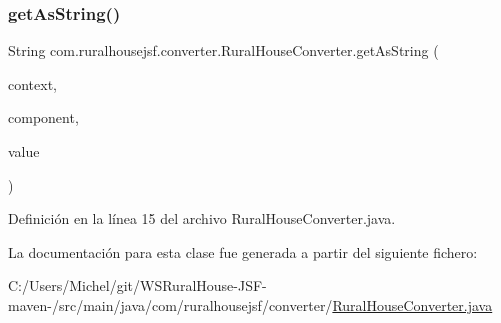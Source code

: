 \subsubsection{\texorpdfstring{getAsString()}{getAsString()}}
{\footnotesize\ttfamily String com.\+ruralhousejsf.\+converter.\+Rural\+House\+Converter.\+get\+As\+String (\begin{DoxyParamCaption}\item[{Faces\+Context}]{context,  }\item[{U\+I\+Component}]{component,  }\item[{Object}]{value }\end{DoxyParamCaption})}



Definición en la línea 15 del archivo Rural\+House\+Converter.\+java.



La documentación para esta clase fue generada a partir del siguiente fichero\+:\begin{DoxyCompactItemize}
\item 
C\+:/\+Users/\+Michel/git/\+W\+S\+Rural\+House-\/\+J\+S\+F-\/maven-\//src/main/java/com/ruralhousejsf/converter/\mbox{\hyperlink{_rural_house_converter_8java}{Rural\+House\+Converter.\+java}}\end{DoxyCompactItemize}

